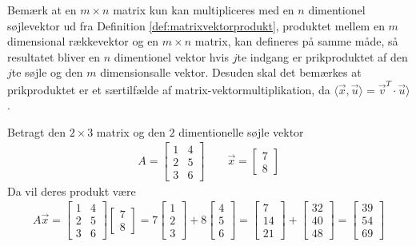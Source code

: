 Bemærk at en $m \times n$ matrix kun kan multipliceres med en $n$ dimentionel søjlevektor ud fra Definition \ref{def:matrixvektorprodukt}, produktet mellem en $m$ dimensional rækkevektor og en $m \times n$ matrix, kan defineres på samme måde, så resultatet bliver en $n$ dimentionel vektor hvis $j$te indgang er prikproduktet af den $j$te søjle og den $m$ dimensionsalle vektor. 
Desuden skal det bemærkes at prikproduktet er et særtilfælde af matrix-vektormultiplikation, da $\langle \vec{x}, \vec{u}\rangle = \vec{v}^T \cdot \vec{u}\rangle$.
\begin{eks}
Betragt den $2 \times 3$ matrix og den $2$ dimentionelle søjle vektor
\begin{align*}
A=
\begin{bmatrix}
1 & 4\\
2 & 5\\
3 & 6
\end{bmatrix}
\qquad
\vec{x}=
\begin{bmatrix}
7\\
8
\end{bmatrix}
\end{align*}
Da vil deres produkt være
\begin{align*}
A\vec{x}= \begin{bmatrix}
1 & 4\\
2 & 5\\
3 & 6
\end{bmatrix}
\begin{bmatrix}
7\\
8
\end{bmatrix}
=
7
\begin{bmatrix}
1\\
2\\
3
\end{bmatrix}
+ 8
\begin{bmatrix}
4\\
5\\
6
\end{bmatrix}=
\begin{bmatrix}
7\\
14\\
21
\end{bmatrix}
+
\begin{bmatrix}
32\\
40\\
48
\end{bmatrix}
=
\begin{bmatrix}
39\\
54\\
69
\end{bmatrix}
\end{align*}
\end{eks}
